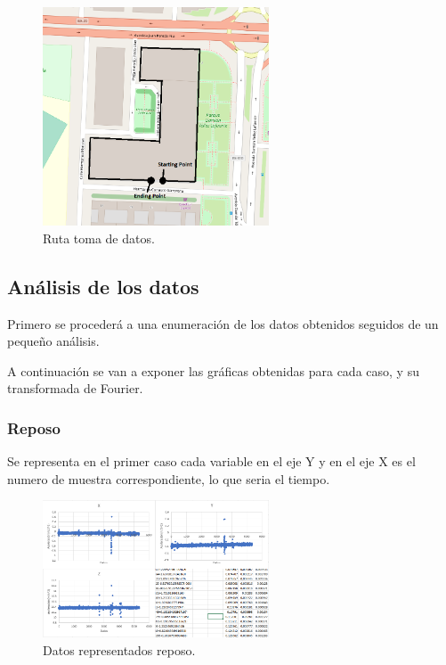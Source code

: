 \documentclass[12pt]{article}
\numberwithin{equation}{section}
\begin{document}
\begin{figure}[h]
    \centering
    \includegraphics[width=0.6\textwidth]{plaza.png}
    \caption{Ruta toma de datos.}
    \label{fig:cuadra}
\end{figure}



\subsection{Análisis de los datos}
Primero se procederá a una enumeración de los datos obtenidos seguidos de un pequeño análisis.

A continuación se van a exponer las gráficas obtenidas para cada caso, y su transformada de Fourier.

\newpage

\subsubsection{Reposo}

Se representa en el primer caso cada variable en el eje Y y en el eje X es el numero de muestra correspondiente, lo que seria el tiempo.

\begin{figure}[h]
    \centering
    \includegraphics[width=0.6\textwidth]{reposoraw.png}
    \caption{Datos representados reposo.}
    \label{fig:reposoraw}
\end{figure}
\end{document}
